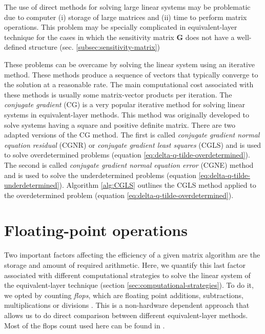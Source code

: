 The use of direct methods for solving large linear systems may be problematic due to computer 
(i) storage of large matrices and (ii) time to perform matrix operations.
This problem may be specially complicated in equivalent-layer technique for the cases in which 
the sensitivity matrix $\mathbf{G}$ does not have a well-defined structure (sec. \ref{subsec:sensitivity-matrix})

These problems can be overcame by solving the linear system using an iterative method.
These methods produce a sequence of vectors that typically converge to the solution at a
reasonable rate. The main computational cost associated with these methods is usually some matrix-vector products 
per iteration.
The \textit{conjugate gradient} (CG) is a very popular iterative method for solving linear systems in equivalent-layer methods.
This method was originally developed to solve systems having a square and positive definite matrix.
There are two adapted versions of the CG method. The first is called \textit{conjugate gradient normal equation residual} (CGNR) 
\citet[][sec. 11.3]{golub-vanloan2013} or \textit{conjugate gradient least squares} (CGLS) \cite[][p. 165]{aster_etal2019} and is
used to solve overdetermined problems (equation \ref{eq:delta-q-tilde-overdetermined}). 
The second is called \textit{conjugate gradient normal equation error} (CGNE) method 
\citet[][sec. 11.3]{golub-vanloan2013} and is used to solve the underdetermined problems (equation \ref{eq:delta-q-tilde-underdetermined}).
Algorithm \ref{alg:CGLS} outlines the CGLS method applied to the overdetermined problem (equation \ref{eq:delta-q-tilde-overdetermined}).

\section{Floating-point operations}
\label{sec:flops}

Two important factors affecting the efficiency of a given matrix algorithm are the storage and amount of required arithmetic. 
Here, we quantify this last factor associated with different computational strategies to solve the linear system of the
equivalent-layer technique (section \ref{sec:computational-strategies}). To do it, we opted by counting \textit{flops},
which are floating point additions, subtractions, multiplications or divisions \cite[][ p. 12--14]{golub-vanloan2013}.
This is a non-hardware dependent approach that allows us to do direct comparison between different equivalent-layer methods.
Most of the flops count used here can be found in \citet[][p. 12, 106, 107 and 164]{golub-vanloan2013}.

